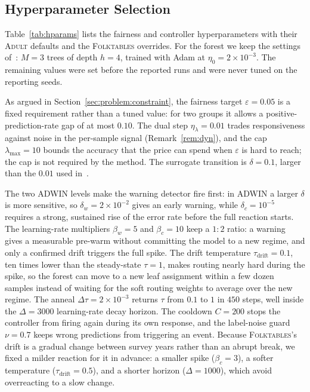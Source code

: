 \documentclass[conference]{IEEEtran}
\newcommand{\adult}{\textsc{Adult}}
\newcommand{\folk}{\textsc{Folktables}}
\begin{document}
\subsection{Hyperparameter Selection}
\label{sec:method:hpo}
Table~\ref{tab:hparams} lists the fairness and controller hyperparameters with 
their \adult{} defaults and the \folk{} overrides. For the forest we keep the
settings of~\cite{chowdhury2024enhancing}: $M=3$ trees of depth $h=4$, trained with 
Adam at $\eta_0=2{\times}10^{-3}$. The remaining values were set before the reported 
runs and were never tuned on the reporting seeds. 

As argued in Section~\ref{sec:problem:constraint}, the fairness target $\varepsilon=0.05$ is a fixed requirement rather 
than a tuned value: for two groups it allows a positive-prediction-rate
gap of at most $0.10$. The dual step $\eta_\lambda=0.01$ trades responsiveness against 
noise in the per-sample signal (Remark~\ref{rem:dyn}), and the cap
$\lambda_{\max}=10$ bounds the accuracy that the price can spend when $\varepsilon$ is 
hard to reach; the cap is not required by the method. The surrogate transition is $\delta=0.1$, larger than the
$0.01$ used in~\cite{chowdhury2024enhancing}.

The two ADWIN levels make the warning detector fire first: in ADWIN a larger $\delta$ is 
more sensitive, so $\delta_w=2{\times}10^{-2}$ gives an early warning,
while $\delta_c=10^{-5}$ requires a strong, sustained rise of the error rate before the 
full reaction starts. The learning-rate multipliers $\beta_w{=}5$ and
$\beta_c{=}10$ keep a $1{:}2$ ratio: a warning gives a measurable pre-warm without committing 
the model to a new regime, and only a confirmed drift triggers the
full spike. The drift temperature $\tau_{\mathrm{drift}}=0.1$, ten times lower than the 
steady-state $\tau=1$, makes routing nearly hard during the spike, so the
forest can move to a new leaf assignment within a few dozen samples instead of waiting 
for the soft routing weights to average over the new regime. The anneal
$\Delta\tau=2{\times}10^{-3}$ returns $\tau$ from $0.1$ to $1$ in $450$ steps, well 
inside the $\Delta=3000$ learning-rate decay horizon. The cooldown $C=200$
stops the controller from firing again during its own response, and the label-noise 
guard $\nu=0.7$ keeps wrong predictions from triggering
an event. Because \folk{}'s drift is a gradual change between survey years rather 
than an abrupt break, we fixed a milder reaction for it in advance: a smaller
spike ($\beta_c=3$), a softer temperature ($\tau_{\mathrm{drift}}=0.5$), and a 
shorter horizon ($\Delta=1000$), which avoid overreacting to a slow change.
\end{document}
